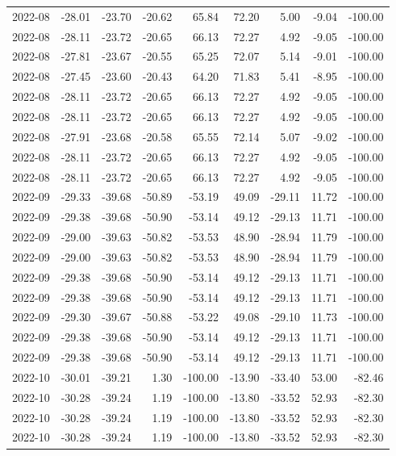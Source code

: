 \begin{table}[ht]
\begin{tabular}{lrrrrrrrr}
  2022-08 & -28.01 & -23.70 & -20.62 & 65.84 & 72.20 & 5.00 & -9.04 & -100.00 \\ 
  2022-08 & -28.11 & -23.72 & -20.65 & 66.13 & 72.27 & 4.92 & -9.05 & -100.00 \\ 
  2022-08 & -27.81 & -23.67 & -20.55 & 65.25 & 72.07 & 5.14 & -9.01 & -100.00 \\ 
  2022-08 & -27.45 & -23.60 & -20.43 & 64.20 & 71.83 & 5.41 & -8.95 & -100.00 \\ 
  2022-08 & -28.11 & -23.72 & -20.65 & 66.13 & 72.27 & 4.92 & -9.05 & -100.00 \\ 
  2022-08 & -28.11 & -23.72 & -20.65 & 66.13 & 72.27 & 4.92 & -9.05 & -100.00 \\ 
  2022-08 & -27.91 & -23.68 & -20.58 & 65.55 & 72.14 & 5.07 & -9.02 & -100.00 \\ 
  2022-08 & -28.11 & -23.72 & -20.65 & 66.13 & 72.27 & 4.92 & -9.05 & -100.00 \\ 
  2022-08 & -28.11 & -23.72 & -20.65 & 66.13 & 72.27 & 4.92 & -9.05 & -100.00 \\ 
  2022-09 & -29.33 & -39.68 & -50.89 & -53.19 & 49.09 & -29.11 & 11.72 & -100.00 \\ 
  2022-09 & -29.38 & -39.68 & -50.90 & -53.14 & 49.12 & -29.13 & 11.71 & -100.00 \\ 
  2022-09 & -29.00 & -39.63 & -50.82 & -53.53 & 48.90 & -28.94 & 11.79 & -100.00 \\ 
  2022-09 & -29.00 & -39.63 & -50.82 & -53.53 & 48.90 & -28.94 & 11.79 & -100.00 \\ 
  2022-09 & -29.38 & -39.68 & -50.90 & -53.14 & 49.12 & -29.13 & 11.71 & -100.00 \\ 
  2022-09 & -29.38 & -39.68 & -50.90 & -53.14 & 49.12 & -29.13 & 11.71 & -100.00 \\ 
  2022-09 & -29.30 & -39.67 & -50.88 & -53.22 & 49.08 & -29.10 & 11.73 & -100.00 \\ 
  2022-09 & -29.38 & -39.68 & -50.90 & -53.14 & 49.12 & -29.13 & 11.71 & -100.00 \\ 
  2022-09 & -29.38 & -39.68 & -50.90 & -53.14 & 49.12 & -29.13 & 11.71 & -100.00 \\ 
  2022-10 & -30.01 & -39.21 & 1.30 & -100.00 & -13.90 & -33.40 & 53.00 & -82.46 \\ 
  2022-10 & -30.28 & -39.24 & 1.19 & -100.00 & -13.80 & -33.52 & 52.93 & -82.30 \\ 
  2022-10 & -30.28 & -39.24 & 1.19 & -100.00 & -13.80 & -33.52 & 52.93 & -82.30 \\ 
  2022-10 & -30.28 & -39.24 & 1.19 & -100.00 & -13.80 & -33.52 & 52.93 & -82.30 \\ 

\end{tabular}
\end{table}
